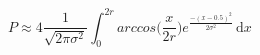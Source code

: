 \documentclass[preview]{standalone}
\begin{document}
\begin{equation*}
P \approx 4\frac{1}{\sqrt{2\pi\sigma^2}}\int_0^{2r} arccos\Big(\frac{x}{2r}\Big) e^\frac{-(x-0.5)^2}{2\sigma^2}\, \mathrm{d}x
\end{equation*}
\end{document}
